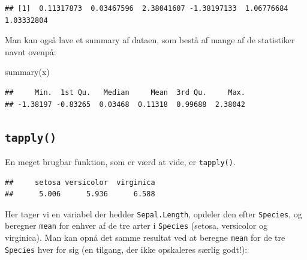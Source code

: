 \documentclass[
]{book}
\newenvironment{Shaded}{\begin{snugshade}}{\end{snugshade}}
\newcommand{\CommentTok}[1]{\textcolor[rgb]{0.56,0.35,0.01}{\textit{#1}}}
\newcommand{\FunctionTok}[1]{\textcolor[rgb]{0.00,0.00,0.00}{#1}}
\newcommand{\NormalTok}[1]{#1}
\newcommand{\SpecialCharTok}[1]{\textcolor[rgb]{0.00,0.00,0.00}{#1}}
\begin{document}
\begin{verbatim}
## [1]  0.11317873  0.03467596  2.38041607 -1.38197133  1.06776684  1.03332804
\end{verbatim}

Man kan også lave et summary af dataen, som bestå af mange af de statistiker navnt ovenpå:

\begin{Shaded}
\begin{Highlighting}[]
\FunctionTok{summary}\NormalTok{(x)}
\end{Highlighting}
\end{Shaded}

\begin{verbatim}
##     Min.  1st Qu.   Median     Mean  3rd Qu.     Max. 
## -1.38197 -0.83265  0.03468  0.11318  0.99688  2.38042
\end{verbatim}

\hypertarget{tapply}{%
\subsection{\texorpdfstring{\texttt{tapply()}}{tapply()}}\label{tapply}}

En meget brugbar funktion, som er værd at vide, er \texttt{tapply()}.

\begin{Shaded}
\end{Shaded}

\begin{verbatim}
##     setosa versicolor  virginica 
##      5.006      5.936      6.588
\end{verbatim}

Her tager vi en variabel der hedder \texttt{Sepal.Length}, opdeler den efter \texttt{Species}, og beregner \texttt{mean} for enhver af de tre arter i \texttt{Species} (setosa, versicolor og virginica). Man kan opnå det samme resultat ved at beregne \texttt{mean} for de tre \texttt{Species} hver for sig (en tilgang, der ikke opskaleres særlig godt!):
\end{document}
